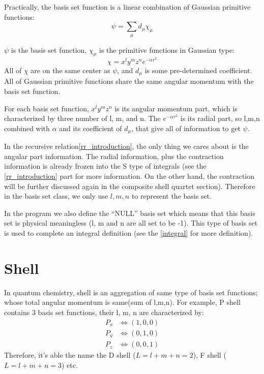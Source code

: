 Practically, the basis set function is a linear combination of 
Gaussian primitive functions:
\begin{equation}
	\psi = \sum_{\mu}d_{\mu}\chi_{\mu}
\end{equation}

$\psi$ is the basis set function, $\chi_{\mu}$ is the primitive 
functions in Gaussian type:
\begin{equation}\label{gaussian_function}
	\chi = x^{l}y^{m}z^{n}e^{-\alpha r^{2}}
\end{equation}
All of $\chi$ are on the same center as $\psi$, and $d_{\mu}$ is 
some pre-determined coefficient. All of Gaussian primitive 
functions share the same angular momentum with the basis set
function.

For each basis set function, $x^{l}y^{m}z^{n}$ is its angular momentum part,
which is characterized by three number of l, m, and n. The $e^{-\alpha r^{2}}$
is its radial part, so l,m,n combined with $\alpha$ and its coefficient of
$d_{\mu}$, that give all of information to get $\psi$.

In the recursive relation\ref{rr_introduction}, the only thing we cares about 
is the angular part information. The radial information, plus the contraction 
information is already frozen into the S type of integrals (see the 
\ref{rr_introduction} part for more information. On the other hand, the 
contraction will be further discussed again in the
composite shell quartet section). Therefore in the basis set class, we only use $l,m,n$
to represent the basis set.

In the program we also define the ``NULL'' basis set which means that 
this basis set is physical meaningless (l, m and n are all set to be -1). 
This type of basis set is used to complete an integral definition (see the \ref{integral} 
for more definition).

\section{Shell}
%
%
%
\label{shell}

In quantum chemistry, shell is an aggregation of same type of basis set
functions; whose total angular momentum is same(sum of l,m,n). For example, 
P shell contains 3 basis set functions, their l, m, n are characterized by:
\begin{align}
	P_{x} &\Leftrightarrow (1,0,0) \nonumber \\
	P_{y} &\Leftrightarrow (0,1,0) \nonumber \\
	P_{z} &\Leftrightarrow (0,0,1)
\end{align}
Therefore, it's able the name the D shell ($L = l+m+n = 2$), 
F shell ($L = l+m+n = 3$) etc.


